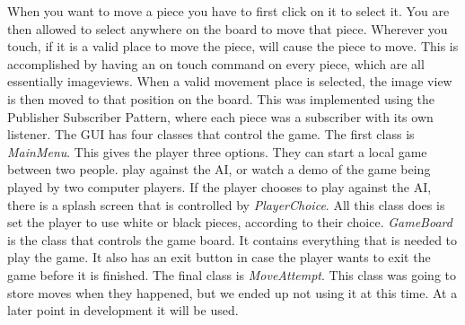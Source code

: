 \documentclass{article}
\begin{document}
When you want to move a piece you have to first click on it to select it. You are then allowed to select anywhere on the board to move that piece. Wherever you touch, if it is a valid place to move the piece, will cause the piece to move. This is accomplished by having an on touch command on every piece, which are all essentially imageviews. When a valid movement place is selected, the image view is then moved to that position on the board. This was implemented using the Publisher Subscriber Pattern, where each piece was a subscriber with its own listener. 
	The GUI has four classes that control the game. The first class is \textit{MainMenu}. This gives the player three options. They can start a local game between two people. play against the AI, or watch a demo of the game being played by two computer players. If the player chooses to play against the AI, there is a splash screen that is controlled by \textit{PlayerChoice}. All this class does is set the player to use white or black pieces, according to their choice. \textit{GameBoard} is the class that controls the game board. It contains everything that is needed to play the game. It also has an exit button in case the player wants to exit the game before it is finished. The final class is \textit{MoveAttempt}. This class was going to store moves when they happened, but we ended up not using it at this time. At a later point in development it will be used. 
\end{document}
